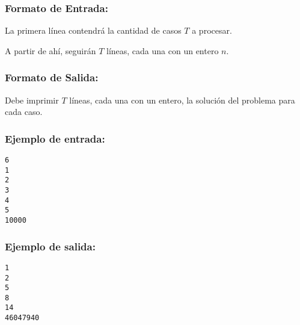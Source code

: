 \hypertarget{formato-de-entrada}{%
\subsubsection{Formato de Entrada:}\label{formato-de-entrada}}

La primera línea contendrá la cantidad de casos \(T\) a procesar.

A partir de ahí, seguirán \(T\) líneas, cada una con un entero \(n\).

\hypertarget{formato-de-salida}{%
\subsubsection{Formato de Salida:}\label{formato-de-salida}}

Debe imprimir \(T\) líneas, cada una con un entero, la solución del
problema para cada caso.

\hypertarget{ejemplo-de-entrada}{%
\subsubsection{Ejemplo de entrada:}\label{ejemplo-de-entrada}}

\begin{verbatim}
6
1
2
3
4
5
10000
\end{verbatim}

\hypertarget{ejemplo-de-salida}{%
\subsubsection{Ejemplo de salida:}\label{ejemplo-de-salida}}

\begin{verbatim}
1
2
5
8
14
46047940
\end{verbatim}
